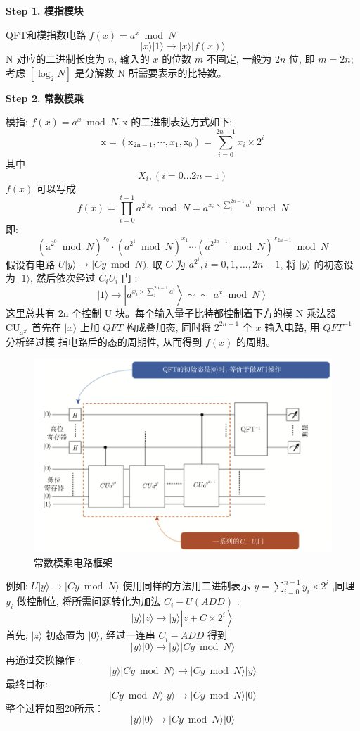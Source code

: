 \documentclass[12pt,hyperref,a4paper,UTF8]{ctexart}
\begin{document}
\noindent
\textbf{Step 1. 模指模块}
\vskip 10pt

QFT和模指数电路 $f(x)=a^x \bmod N$
$$
|x\rangle|1\rangle \rightarrow|x\rangle|f(x)\rangle
$$
$\mathrm{N}$ 对应的二进制长度为 $n$, 输入的 $x$ 的位数 $m$ 不固定, 一般为 $2 n$ 位, 即 $m=2 n$; 考虑 $\left[\log _2 N\right]$ 是分解数 $\mathrm{N}$ 所需要表示的比特数。

\vskip 10pt
\noindent
\textbf{Step 2. 常数模乘}
\vskip 10pt

模指: $f(x)=a^x \bmod N, \mathrm{x}$ 的二进制表达方式如下:
$$
\mathrm{x}=\left(\mathrm{x}_{2 \mathrm{n}-1}, \cdots, x_1, \mathrm{x}_0\right)=\sum_{i=0}^{2 n-1} x_i \times 2^i
$$
其中
$$
X_i,(i=0 \ldots 2 n-1)
$$
$f(x)$ 可以写成
$$
f(x)=\prod_{i=0}^{t-1} a^{2^i x_i} \bmod N=a^{x_i \times \sum_i^{2 n-1} a^i} \bmod N
$$
即:
$$
\left(\mathrm{a}^{2^0} \bmod N\right)^{x_0} \cdot\left(a^{2^1} \bmod N\right)^{x_1} \cdots\left(a^{2^{2 n-1}} \bmod N\right)^{x_{2 n-1}} \bmod N
$$
假设有电路 $U|y\rangle \rightarrow \mid C y \bmod N)$, 取 $C$ 为 $a^{2^i}, i=0,1, \ldots, 2 n-1$, 将 $|y\rangle$ 的初态设为 $|1\rangle$, 然后依次经过 $C_i U_i$ 门 :
$$
|1\rangle \rightarrow\left|a^{x_i \times \sum_i^{2 n-1} a^i}\right\rangle \sim \sim\left|a^x \bmod N\right\rangle
$$
这里总共有 $2 \mathrm{n}$ 个控制 $\mathrm{U}$ 块。每个输入量子比特都控制着下方的模 $\mathrm{N}$ 乘法器 $\mathrm{CU}_{\mathrm{a}^{2^i}}$ 
首先在 $|x\rangle$ 上加 $Q F T$ 构成叠加态, 同时将 $2^{2 n-1}$ 个 $x$ 输入电路, 用 $Q F T^{-1}$ 分析经过模 指电路后的态的周期性, 从而得到 $f(x)$ 的周期。

\begin{figure}[!htbp]     
    \centering     
    \includegraphics[width =0.7 \textwidth]{figures/常数模乘1.png}     
    \caption{常数模乘电路框架}
\end{figure}

例如: $U|y\rangle \rightarrow|C y \bmod N\rangle$ 使用同样的方法用二进制表示 $y=\sum_{i=0}^{n-1} y_i \times 2^i$ ,同理 $y_i$ 做控制位, 将所需问题转化为加法 $C_i-U(A D D)$ :
$$
|y\rangle|z\rangle \rightarrow|y\rangle\left|z+C \times 2^i\right\rangle
$$
首先, $|z\rangle$ 初态置为 $|0\rangle$, 经过一连串 $C_i-A D D$ 得到
$$
|y\rangle|0\rangle \rightarrow|y\rangle|C y \bmod N\rangle
$$
再通过交换操作 :
$$
|y\rangle|C y \bmod N\rangle \rightarrow|C y \bmod N\rangle|y\rangle
$$
最终目标:
$$
|C y \bmod N\rangle|y\rangle \rightarrow|C y \bmod N\rangle|0\rangle
$$
整个过程如图20所示：
$$
|y\rangle|0\rangle \rightarrow|C y \bmod N\rangle|0\rangle
$$
\end{document}
